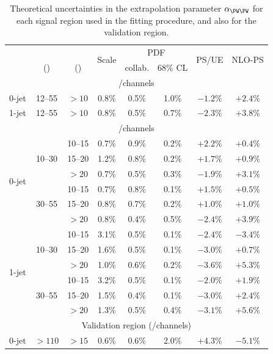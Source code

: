 \begin{table}
	\centering
	\begin{tabular}{ccc|ccccc}
		\toprule
		& \mll & \ptsubleadlep & \multirow{2}{*}{Scale} & \multicolumn{2}{c}{PDF} & \multirow{2}{*}{PS/UE} & \multirow{2}{*}{NLO-PS} \\
		& (\GeV) & (\GeV) & & collab. & 68\% CL & & \\
		\midrule
		\multicolumn{8}{c}{\eech/\mmch channels} \\
		\midrule
		0-jet & 12--55 & $>10$ & 0.8\% & 0.5\% & 1.0\% & $-1.2\%$ & $+2.4\%$ \\
		1-jet & 12--55 & $>10$ & 0.8\% & 0.5\% & 0.7\% & $-2.3\%$ & $+3.8\%$ \\
		\midrule
		\multicolumn{8}{c}{\emch/\mech channels} \\
		\midrule
		\multirow{6}{*}{0-jet}
		& \multirow{3}{*}{10--30}
	    &  10--15 & 0.7\% & 0.9\% & 0.2\% & $+2.2\%$ & $+0.4\%$ \\
		&& 15--20 & 1.2\% & 0.8\% & 0.2\% & $+1.7\%$ & $+0.9\%$ \\
		&&  $>20$ & 0.7\% & 0.5\% & 0.3\% & $-1.9\%$ & $+3.1\%$ \\
		\cmidrule(lr){2-8}
		& \multirow{3}{*}{30--55}
		&  10--15 & 0.7\% & 0.8\% & 0.1\% & $+1.5\%$ & $+0.5\%$ \\
		&& 15--20 & 0.8\% & 0.7\% & 0.2\% & $+1.0\%$ & $+1.0\%$ \\
		&&  $>20$ & 0.8\% & 0.4\% & 0.5\% & $-2.4\%$ & $+3.9\%$ \\
		\cmidrule(lr){1-8}
		\multirow{6}{*}{1-jet}
		& \multirow{3}{*}{10--30}
	    &  10--15 & 3.1\% & 0.5\% & 0.1\% & $-2.4\%$ & $-3.4\%$ \\
		&& 15--20 & 1.6\% & 0.5\% & 0.1\% & $-3.0\%$ & $+0.7\%$ \\
		&&  $>20$ & 1.0\% & 0.6\% & 0.2\% & $-3.6\%$ & $+5.3\%$ \\
		\cmidrule(lr){2-8}
		& \multirow{3}{*}{30--55}
		&  10--15 & 3.2\% & 0.5\% & 0.1\% & $-2.0\%$ & $+1.9\%$ \\
		&& 15--20 & 1.5\% & 0.4\% & 0.1\% & $-3.0\%$ & $+2.4\%$ \\
		&&  $>20$ & 1.3\% & 0.5\% & 0.4\% & $-3.1\%$ & $+5.6\%$ \\
		\midrule
		\multicolumn{8}{c}{Validation region (\emch/\mech channels)} \\
		\midrule
		0-jet & $>110$ & $>15$ & 0.6\% & 0.6\% & 2.0\% & $+4.3\%$ & $-5.1\%$ \\
		\bottomrule
	\end{tabular}
	\caption{Theoretical uncertainties in the \WW extrapolation parameter $\alpha_{\WW}$ 
	for each signal region used in the fitting procedure, and also for the validation 
	region.}
	\label{tab:ww_bkg:alpha_unc}
\end{table}



